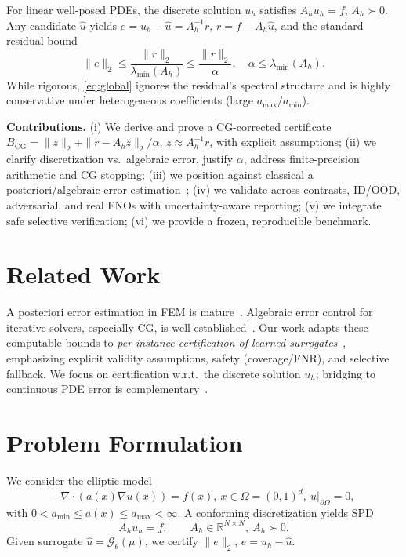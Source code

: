 \documentclass[conference]{IEEEtran}
\theoremstyle{plain}
\theoremstyle{definition}
\begin{document}
For linear well-posed PDEs, the discrete solution $u_h$ satisfies $A_h u_h=f$, $A_h\succ 0$. Any candidate $\hat{u}$ yields $e=u_h-\hat{u}=A_h^{-1}r$, $r=f-A_h\hat{u}$, and the standard residual bound
\begin{equation}
\|e\|_2 \le \frac{\|r\|_2}{\lambda_{\min}(A_h)} \le \frac{\|r\|_2}{\alpha}, \quad \alpha \le \lambda_{\min}(A_h).
\label{eq:global}
\end{equation}
While rigorous, \eqref{eq:global} ignores the residual's spectral structure and is highly conservative under heterogeneous coefficients (large $a_{\max}/a_{\min}$).

\textbf{Contributions.} (i) We derive and prove a CG-corrected certificate $B_{\mathrm{CG}}=\|z\|_2 + \|r-A_h z\|_2/\alpha$, $z\approx A_h^{-1}r$, with explicit assumptions; (ii) we clarify discretization vs.\ algebraic error, justify $\alpha$, address finite-precision arithmetic and CG stopping; (iii) we position against classical a posteriori/algebraic-error estimation~\cite{ainsworth2000posteriori,verfurth2013posteriori,meurant1999computable,meurant2013accuracy,jiranek2010posteriori}; (iv) we validate across contrasts, ID/OOD, adversarial, and real FNOs with uncertainty-aware reporting; (v) we integrate safe selective verification; (vi) we provide a frozen, reproducible benchmark.

\section{Related Work}
\label{sec:related}
A posteriori error estimation in FEM is mature~\cite{ainsworth2000posteriori,verfurth2013posteriori}. Algebraic error control for iterative solvers, especially CG, is well-established~\cite{meurant1999computable,meurant2006lanczos,meurant2013accuracy,strakos2005error,jiranek2010posteriori,papez2014distribution,carson2018numerical}. Our work adapts these computable bounds to \emph{per-instance certification of learned surrogates}~\cite{li2020fourier,kovachki2023neural,lu2021learning,azizzadenesheli2024neural}, emphasizing explicit validity assumptions, safety (coverage/FNR), and selective fallback. We focus on certification w.r.t.\ the discrete solution $u_h$; bridging to continuous PDE error is complementary~\cite{ainsworth2000posteriori,verfurth2013posteriori}.

\section{Problem Formulation}
\label{sec:form}
We consider the elliptic model
\begin{equation}
-\nabla\cdot(a(x)\nabla u(x))=f(x),\ x\in\Omega=(0,1)^d,\ u|_{\partial\Omega}=0,
\end{equation}
with $0 < a_{\min} \le a(x) \le a_{\max} < \infty$. A conforming discretization yields SPD
\begin{equation}
A_h u_h = f, \qquad A_h\in\mathbb{R}^{N\times N},\ A_h\succ 0.
\end{equation}
Given surrogate $\hat{u}=\mathcal{G}_\theta(\mu)$, we certify $\|e\|_2$, $e=u_h-\hat{u}$.
\end{document}
